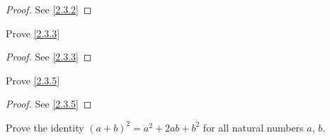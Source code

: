 \begin{proof}
  See \cref{2.3.2}
\end{proof}

\begin{ex}\label{ex:2.3.2}
  Prove \cref{2.3.3}
\end{ex}

\begin{proof}
  See \cref{2.3.3}
\end{proof}

\begin{ex}\label{ex:2.3.3}
  Prove \cref{2.3.5}
\end{ex}

\begin{proof}
  See \cref{2.3.5}
\end{proof}

\begin{ex}\label{ex:2.3.4}
  Prove the identity \((a + b)^2 = a^2 + 2ab + b^2\) for all natural numbers \(a\), \(b\).
\end{ex}


